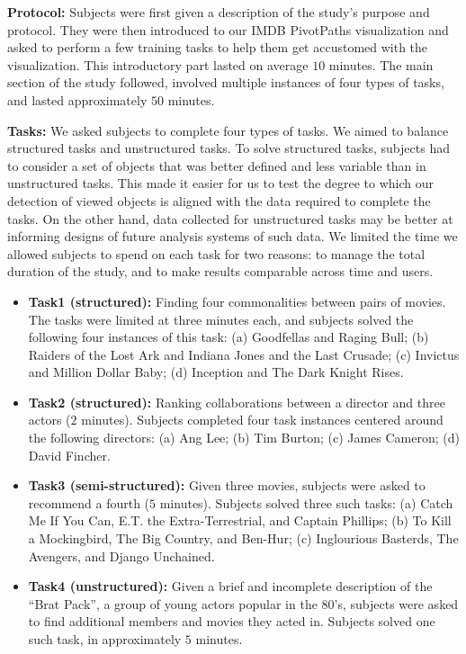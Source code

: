 \noindent\textbf{Protocol:} Subjects were first given a description of the study's purpose and protocol. They were then introduced to our IMDB PivotPaths visualization and asked to perform a few training tasks to help them get accustomed with the visualization. This introductory part lasted on average $10$ minutes. The main section of the study followed, involved multiple instances of four types of tasks, and lasted approximately $50$ minutes. 

\noindent\textbf{Tasks:} We asked subjects to complete four types of tasks. We aimed to balance structured tasks and unstructured tasks. To solve structured tasks, subjects had to consider a set of objects that was better defined and less variable than in unstructured tasks. This made it easier for us to test the degree to which our detection of viewed objects is aligned with the data required to complete the tasks. On the other hand, data collected for unstructured tasks may be better at informing designs of future analysis systems of such data. We limited the time we allowed subjects to spend on each task for two reasons: to manage the total duration of the study, and to make results comparable across time and users.

\begin{itemize}
\item \textbf{Task1 (structured):} Finding four commonalities between pairs of movies. The tasks were limited at three minutes each, and subjects solved the following four instances of this task: (a) Goodfellas and Raging Bull; (b) Raiders of the Lost Ark and Indiana Jones and the Last Crusade; (c) Invictus and Million Dollar Baby; (d) Inception and The Dark Knight Rises.  
\item \textbf{Task2 (structured):} Ranking collaborations between a director and three actors ($2$ minutes).  Subjects completed four task instances centered around the following directors: (a) Ang Lee; (b) Tim Burton; (c) James Cameron; (d) David Fincher.  
\item \textbf{Task3 (semi-structured):} Given three movies, subjects were asked to recommend a fourth ($5$ minutes). Subjects solved three such tasks: (a) Catch Me If You Can, E.T. the Extra-Terrestrial, and Captain Phillips; (b) To Kill a Mockingbird, The Big Country, and Ben-Hur; (c) Inglourious Basterds, The Avengers, and Django Unchained.



\item \textbf{Task4 (unstructured):} Given a brief and incomplete description of the ``Brat Pack'', a group of young actors popular in the 80's, subjects were asked to find additional members and movies they acted in. Subjects solved one such task, in approximately $5$ minutes. 
\end{itemize}


